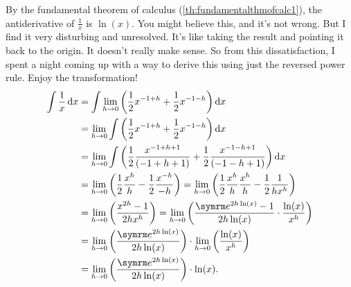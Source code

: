 By the fundamental theorem of calculus (\cref{th:fundamentalthmofcalc1}), the antiderivative of $\frac{1}{x}$ is $\ln(x)$. You might believe this, and it's not wrong. But I find it very disturbing and unresolved. It's like taking the result and pointing it back to the origin. It doesn't really make sense. So from this dissatisfaction, I spent a night coming up with a way to derive this using just the reversed power rule. Enjoy the transformation!
\begin{align}
  \int \frac{1}{x}\odif{x} & = \int\lim_{h \appr 0}\left(\frac{1}{2}x^{-1 + h} + \frac{1}{2}x^{-1 - h}\right)\odif{x} \nonumber                                                                                                \\
                           & = \lim_{h \appr 0}\int\left(\frac{1}{2}x^{-1 + h} + \frac{1}{2}x^{-1 - h}\right)\odif{x} \nonumber                                                                                                \\
                           & = \lim_{h \appr 0}\int\left(\frac{1}{2}\frac{x^{-1 + h + 1}}{(-1 + h + 1)} + \frac{1}{2}\frac{x^{-1 - h + 1}}{(-1 - h + 1)}\right)\odif{x} \nonumber                                              \\
                           & = \lim_{h \appr 0}\left(\frac{1}{2}\frac{x^h}{h} - \frac{1}{2}\frac{x^{-h}}{-h}\right) = \lim_{h \appr 0}\left(\frac{1}{2}\frac{x^h}{h}\frac{x^h}{h} - \frac{1}{2}\frac{1}{hx^h}\right) \nonumber \\
                           & = \lim_{h \appr 0}\left(\frac{x^{2h} - 1}{2hx^h}\right) = \lim_{h \appr 0}\left(\frac{\e^{2h\ln(x)} - 1}{2h\ln(x)}\cdot\frac{\ln(x)}{x^h}\right) \nonumber                                        \\
                           & = \lim_{h \appr 0}\left(\frac{\e^{2h\ln(x)}}{2h\ln(x)}\right) \cdot \lim_{h \appr 0}\left(\frac{\ln(x)}{x^h}\right) \nonumber                                                                     \\
                           & = \lim_{h \appr 0}\left(\frac{\e^{2h\ln(x)}}{2h\ln(x)}\right) \cdot \ln(x). \label{eq:logarithmsprove1}
\end{align}
